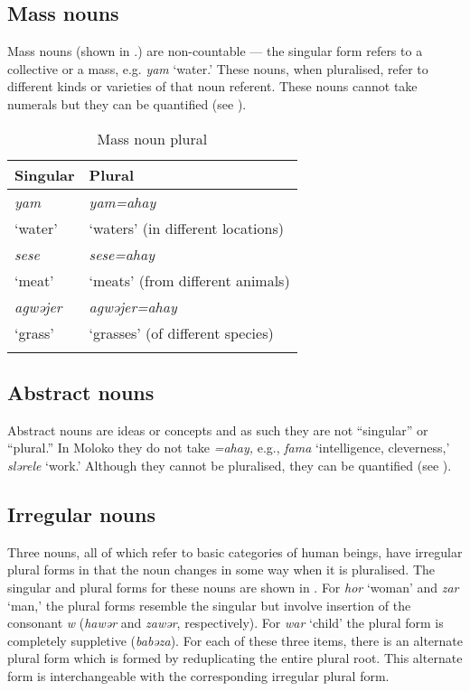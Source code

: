 \subsection{Mass nouns}\label{sec:4.2.4}
\hypertarget{RefHeading1211461525720847}{}
Mass nouns (shown in .) are non-countable --- the singular form refers to a collective or a mass, e.g. \textit{yam} ‘water.’  These nouns, when pluralised, refer to different kinds or varieties of that noun referent. These nouns cannot take numerals but they can be quantified (see ). 

\begin{table}
\begin{tabular}{ll}
\lsptoprule
{Singular} & {Plural}\\\midrule
\textit{yam}  & \textit{yam=ahay} \\
‘water’ &  ‘waters’ (in different locations)\\
\textit{sese}  & \textit{sese=ahay} \\
‘meat’ & ‘meats’ (from different animals)\\
\textit{agwəjer}  & \textit{agwəjer=ahay} \\
‘grass’ & ‘grasses’ (of different species)\\
\lspbottomrule
\end{tabular}
\caption{Mass noun plural}\label{tab:30}
\end{table}

\subsection{Abstract nouns}\label{sec:4.2.5}
\hypertarget{RefHeading1211481525720847}{}
Abstract nouns are ideas or concepts and as such they are not ``singular'' or ``plural.'' In Moloko they do not take \textit{=ahay}\textit{,} e.g., \textit{fama} ‘intelligence, cleverness,’ \textit{slərele} ‘work.’ Although they cannot be pluralised, they can be quantified (see ). 

\subsection{Irregular nouns}\label{sec:4.2.6}
\hypertarget{RefHeading1211501525720847}{}
Three nouns, all of which refer to basic categories of human beings, have irregular plural forms in that the noun changes in some way when it is pluralised. The singular and plural forms for these nouns are shown in . For \textit{hor} ‘woman’ and \textit{zar} ‘man,’ the plural forms resemble the singular but involve insertion of the consonant \textit{w} (\textit{hawər} and \textit{zawər}, respectively). For \textit{war} ‘child’ the plural form is completely suppletive (\textit{babəza}). For each of these three items, there is an alternate plural form which is formed by reduplicating the entire plural root. This alternate form is interchangeable with the corresponding irregular plural form.

